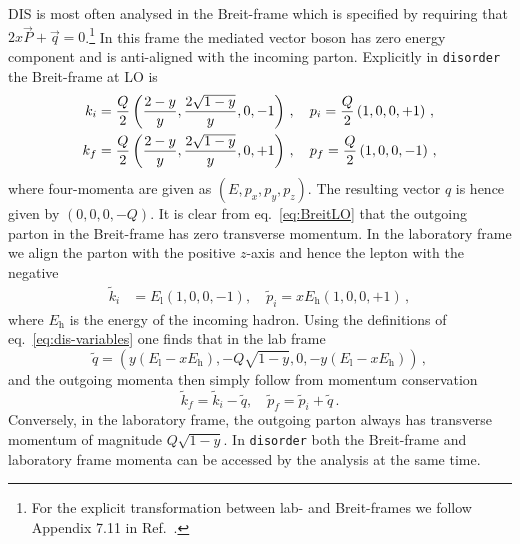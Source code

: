 \documentclass[submission, PhysCodeb]{SciPost_better_arXiv}
\newcommand{\disorder}{{\tt disorder}}
\begin{document}
DIS is most often analysed in the Breit-frame which is specified by
requiring that $2 x \vec{P} + \vec{q} = 0$.\footnote{For the explicit
transformation between lab- and Breit-frames we follow Appendix 7.11
in Ref.~\cite{Devenish:2004pb}.} In this frame the mediated vector
boson has zero energy component and is anti-aligned with the incoming
parton. Explicitly in \disorder{} the Breit-frame at LO is
\begin{align}
  \label{eq:BreitLO}
k_i &= \frac{Q}{2}\left(\frac{2-y}{y},\frac{2\sqrt{1-y}}{y},0,-1 \right)\,, \quad  p_i = \frac{Q}{2}\left(1,0,0,+1 \right)\,, \\ \notag
k_f &= \frac{Q}{2}\left(\frac{2-y}{y},\frac{2\sqrt{1-y}}{y},0,+1 \right)\,, \quad  p_f = \frac{Q}{2}\left(1,0,0,-1 \right)\,, 
\end{align}
where four-momenta are given as $(E,p_x,p_y,p_z)$. The resulting
vector $q$ is hence given by $(0,0,0,-Q)$. It is clear from
eq.~\eqref{eq:BreitLO} that the outgoing parton in the Breit-frame has
zero transverse momentum. In the laboratory frame we align the parton
with the positive $z$-axis and hence the lepton with the negative
\begin{align}
\tilde{k}_i &= E_\mathrm{l}\left(1,0,0,-1 \right), \quad  \tilde{p}_i = x E_\mathrm{h}\left(1,0,0,+1 \right)\,, 
\end{align}
where $E_\mathrm{h}$ is the energy of the incoming hadron. Using the
definitions of eq.~\eqref{eq:dis-variables} one finds that in the lab
frame
\begin{equation}
  \tilde{q} = \left(y(E_\mathrm{l} - x E_\mathrm{h}), -Q\sqrt{1-y},0, -y(E_\mathrm{l} - x E_\mathrm{h})\right)\,, 
\end{equation}
and the outgoing momenta then simply follow from momentum conservation
\begin{equation}
  \label{eq:LabLO}
  \tilde{k}_f = \tilde{k}_i - \tilde{q}, \quad   \tilde{p}_f = \tilde{p}_i + \tilde{q}\,. 
\end{equation}
Conversely, in the laboratory frame, the outgoing parton always has
transverse momentum of magnitude $Q\sqrt{1-y}$. In \disorder{} both
the Breit-frame and laboratory frame momenta can be accessed by the
analysis at the same time.
\end{document}
